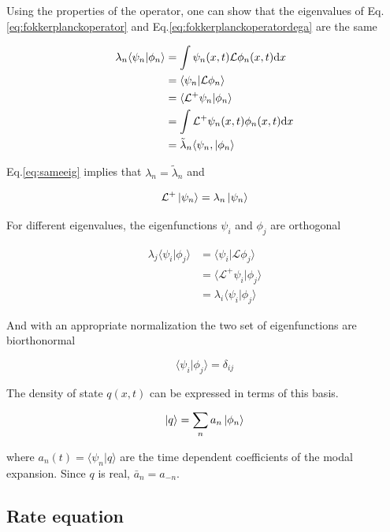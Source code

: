 \documentclass[12pt,twoside]{report}
\def \dd  {{\rm d}}
\begin{document}
Using the properties of the operator, one can show that the eigenvalues of Eq.\eqref{eq:fokkerplanckoperator} and Eq.\eqref{eq:fokkerplanckoperatordega} are the same

\begin{align}
\lambda_n\langle\psi_n|\phi_n\rangle &=\int\psi_n(x,t)\mathcal{L}\phi_n(x,t)\dd x  \nonumber \\
&=\langle\psi_n|\mathcal{L}\phi_n\rangle \nonumber \\
&=\langle\mathcal{L}^+\psi_n|\phi_n\rangle  \nonumber \\
&=\int\mathcal{L}^+\psi_n(x,t)\phi_n(x,t)\dd x \nonumber \\
&=\tilde{\lambda}_n\langle\psi_n,|\phi_n\rangle \label{eq:sameeig}
\end{align}

Eq.\eqref{eq:sameeig} implies that $\lambda_n=\tilde{\lambda}_n$ and

\begin{equation}
\label{eq:fokkerplanckoperatordega2}
\mathcal{L}^+\ket{\psi_n}=\lambda_n\ket{\psi_n}
\end{equation}

For different eigenvalues, the eigenfunctions $\psi_i$ and $\phi_j$ are orthogonal

\begin{align}
\lambda_j\langle\psi_i|\phi_j\rangle
&=\langle\psi_i|\mathcal{L}\phi_j\rangle \nonumber \\
&=\langle\mathcal{L}^+\psi_i|\phi_j\rangle  \nonumber \\
&=\lambda_i\langle\psi_i|\phi_j\rangle \label{eq:lorthogonal}
\end{align}

And with an appropriate normalization the two set of eigenfunctions are biorthonormal

\begin{equation}
\label{eq:dij}
\langle\psi_i|\phi_j\rangle=\delta_{ij}
\end{equation}

The density of state $q(x,t)$ can be expressed in terms of this basis. 

\begin{equation}
\label{eq:p}
\ket{q}=\sum_na_n\ket{\phi_n}
\end{equation}

where $a_n(t)=\langle \psi_n | q\rangle$ are the time dependent coefficients of the modal expansion. Since $q$ is real, $\bar{a}_n=a_{-n}$.


\subsection{Rate equation}
\end{document}
